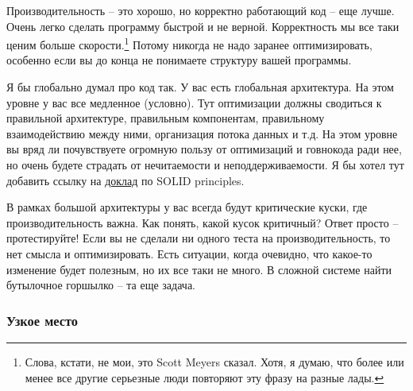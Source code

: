 \documentclass{article}
\begin{document}
Производительность -- это хорошо, но корректно работающий код -- еще лучше. Очень легко сделать программу быстрой и не верной. Корректность мы все таки ценим больше скорости.\footnote{Слова, кстати, не мои, это Scott Meyers сказал. Хотя, я думаю, что более или менее все другие серьезные люди повторяют эту фразу на разные лады.} Потому никогда не надо заранее оптимизировать, особенно если вы до конца не понимаете структуру вашей программы.

Я бы глобально думал про код так. У вас есть глобальная архитектура. На этом уровне у вас все медленное (условно). Тут оптимизации должны сводиться к правильной архитектуре, правильным компонентам, правильному взаимодействию между ними, организация потока данных и т.д. На этом уровне вы вряд ли почувствуете огромную пользу от оптимизаций и говнокода ради нее, но очень будете страдать от нечитаемости и неподдерживаемости. Я бы хотел тут добавить ссылку на \href{https://www.youtube.com/watch?v=Ntraj80qN2k}{доклад} по SOLID principles.

В рамках большой архитектуры у вас всегда будут критические куски, где производительность важна. Как понять, какой кусок критичный? Ответ просто -- протестируйте! Если вы не сделали ни одного теста на производительность, то нет смысла и оптимизировать. Есть ситуации, когда очевидно, что какое-то изменение будет полезным, но их все таки не много. В сложной системе найти бутылочное горшылко -- та еще задача.

\subsubsection{Узкое место}
\end{document}
